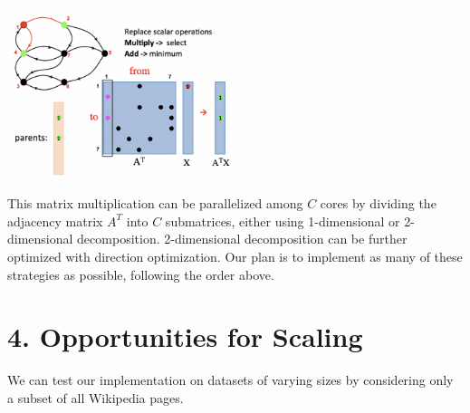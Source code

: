 \documentclass[12pt]{article}
\begin{document}
\begin{center}
\includegraphics[width=0.5\textwidth]{matrix.png}
\end{center}

\noindent This matrix multiplication can be parallelized among $C$ cores by dividing the adjacency matrix $A^T$ into $C$ submatrices, either using 1-dimensional or 2-dimensional decomposition. 2-dimensional decomposition can be further optimized with direction optimization. Our plan is to implement as many of these strategies as possible, following the order above.

\section*{4. Opportunities for Scaling}

We can test our implementation on datasets of varying sizes by considering only a subset of all Wikipedia pages.
\end{document}
